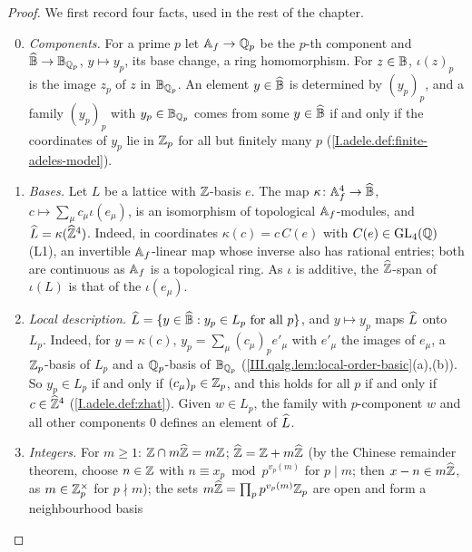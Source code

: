 \begin{lemma}
\end{lemma}
\begin{proof}
We first record four facts, used in the rest of the chapter.
\begin{enumerate}[label=(C\arabic*)]
\setcounter{enumi}{-1}
\item \emph{Components.} For a prime $p$ let $\mathbb{A}_f\to\mathbb{Q}_p$ be the $p$-th component and $\widehat{\mathbb{B}}\to\mathbb{B}_{\mathbb{Q}_p}$, $y\mapsto y_p$, its base change, a ring
  homomorphism. For $z\in\mathbb{B}$, $\iota(z)_p$ is the image $z_p$ of $z$ in $\mathbb{B}_{\mathbb{Q}_p}$. An element $y\in\widehat{\mathbb{B}}$ is determined by $(y_p)_p$, and a family
  $(y_p)_p$ with $y_p\in\mathbb{B}_{\mathbb{Q}_p}$ comes from some $y\in\widehat{\mathbb{B}}$ if and only if the coordinates of $y_p$ lie in $\mathbb{Z}_p$ for all but finitely many $p$
  (\cref{I.adele.def:finite-adeles-model}).
\item \emph{Bases.} Let $L$ be a lattice with $\mathbb{Z}$-basis $e$. The map $\kappa\colon\mathbb{A}_f^4\to\widehat{\mathbb{B}}$, $c\mapsto\sum_\mu c_\mu\iota(e_\mu)$, is an isomorphism of
  topological $\mathbb{A}_f$-modules, and $\widehat{L}=\kappa(\widehat{\mathbb{Z}}^4)$. Indeed, in coordinates $\kappa(c)=c\,C(e)$ with $C(e)\in\mathrm{GL}_4(\mathbb{Q})$ (L1), an invertible
  $\mathbb{A}_f$-linear map whose inverse also has rational entries; both are continuous as $\mathbb{A}_f$ is a topological ring. As $\iota$ is additive, the $\widehat{\mathbb{Z}}$-span of
  $\iota(L)$ is that of the $\iota(e_\mu)$.
\item \emph{Local description.} $\widehat{L}=\{y\in\widehat{\mathbb{B}}:y_p\in L_p\text{ for all }p\}$, and $y\mapsto y_p$ maps $\widehat{L}$ onto $L_p$. Indeed, for $y=\kappa(c)$,
  $y_p=\sum_\mu(c_\mu)_pe'_\mu$ with $e'_\mu$ the images of $e_\mu$, a $\mathbb{Z}_p$-basis of $L_p$ and a $\mathbb{Q}_p$-basis of $\mathbb{B}_{\mathbb{Q}_p}$
  (\cref{III.qalg.lem:local-order-basic}(a),(b)). So $y_p\in L_p$ if and only if $(c_\mu)_p\in\mathbb{Z}_p$, and this holds for all $p$ if and only if
  $c\in\widehat{\mathbb{Z}}^4$ (\cref{I.adele.def:zhat}). Given $w\in L_p$, the family with $p$-component $w$ and all other components $0$ defines an element of $\widehat{L}$.
\item \emph{Integers.} For $m\ge1$: $\mathbb{Z}\cap m\widehat{\mathbb{Z}}=m\mathbb{Z}$; $\widehat{\mathbb{Z}}=\mathbb{Z}+m\widehat{\mathbb{Z}}$ (by the Chinese remainder theorem, choose $n\in\mathbb{Z}$ with $n\equiv x_p\bmod p^{v_p(m)}$
  for $p\mid m$; then $x-n\in m\widehat{\mathbb{Z}}$, as $m\in\mathbb{Z}_p^\times$ for $p\nmid m$); the sets $m\widehat{\mathbb{Z}}=\prod_pp^{v_p(m)}\mathbb{Z}_p$ are open and form a neighbourhood basis

\end{enumerate}
\end{proof}
